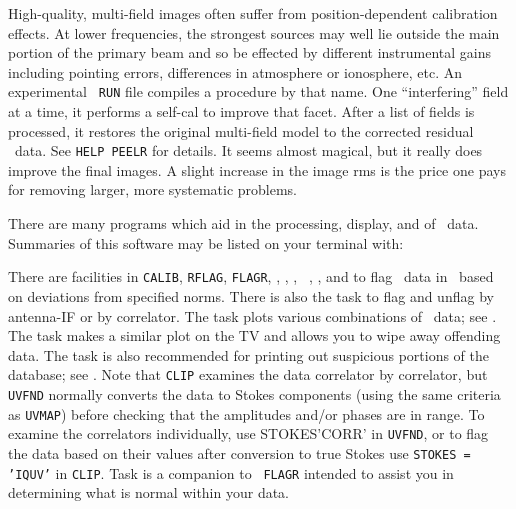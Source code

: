 High-quality, multi-field images often suffer from position-dependent
calibration effects.  At lower frequencies, the strongest sources may
well lie outside the main portion of the primary beam and so be
effected by different instrumental gains including pointing errors,
differences in atmosphere or ionosphere, etc.  An experimental {\tt
RUN} file {\tt {}} compiles a procedure by that name.  One
``interfering'' field at a time, it performs a self-cal to improve
that facet.  After a list of fields is processed, it restores the
original multi-field model to the corrected residual \uv\ data.  See
{\tt HELP PEELR} for details.  It seems almost magical, but it really
does improve the final images.  A slight increase in the image rms is
the price one pays for removing larger, more systematic problems.



     There are many programs which aid in the processing, display,
and  of \uv\ data.  Summaries of this software may be
listed on your terminal with:

     There are facilities in {\tt CALIB}, {\tt RFLAG}, {\tt FLAGR},
{\tt {}}, {\tt {}}, {\tt {}}, {\tt
{}}, {\tt {}}, and {\tt {}} to flag \uv\
data in \AIPS\ based on deviations from specified norms. There is also
the task {\tt \tndx{UVFLG}} to flag and unflag by antenna-IF or by
correlator.  The task {\tt \tndx{UVPLT}} plots various combinations of
\uv\ data; see \Sec{plotuv}.  The task {\tt \Tndx{WIPER}} makes a
similar plot on the TV and allows you to wipe away offending data.
The task {\tt \tndx{UVFND}} is also recommended for printing out
suspicious portions of the database; see \Sec{printuv}.  Note that
{\tt CLIP} examines the data correlator by correlator, but {\tt UVFND}
normally converts the data to Stokes components (using the same
criteria as {\tt UVMAP}) before checking that the amplitudes and/or
phases are in range.  To examine the correlators individually, use
{\us STOKES\qs 'CORR'} in {\tt UVFND}, or to flag the data based on
their values after conversion to true Stokes use {\tt STOKES = 'IQUV'}
in {\tt CLIP}\@.  Task {\tt \tndx{FINDR}} is a companion to {\tt
FLAGR} intended to assist you in determining what is normal within
your data.

